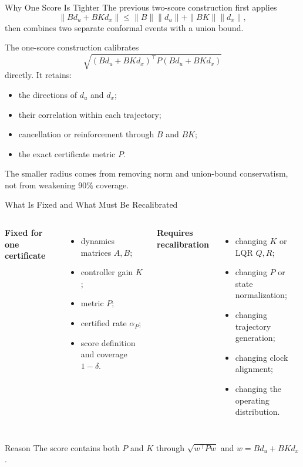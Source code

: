 \documentclass[aspectratio=43,11pt]{beamer}
\begin{document}
\begin{frame}{Why One Score Is Tighter}
The previous two-score construction first applies
\[
\|Bd_u+BKd_x\|
\leq \|B\|\|d_u\|+\|BK\|\|d_x\|,
\]
then combines two separate conformal events with a union bound.

The one-score construction calibrates
\[
\sqrt{(Bd_u+BKd_x)^\top P(Bd_u+BKd_x)}
\]
directly. It retains:
\begin{itemize}
  \item the directions of $d_u$ and $d_x$;
  \item their correlation within each trajectory;
  \item cancellation or reinforcement through $B$ and $BK$;
  \item the exact certificate metric $P$.
\end{itemize}

The smaller radius comes from removing norm and union-bound conservatism, not from weakening 90\% coverage.
\end{frame}

\begin{frame}{What Is Fixed and What Must Be Recalibrated}
\begin{columns}[T]
\textbf{Fixed for one certificate}
\begin{itemize}
  \item dynamics matrices $A,B$;
  \item controller gain $K$;
  \item metric $P$;
  \item certified rate $\alpha_P$;
  \item score definition and coverage $1-\delta$.
\end{itemize}

\textbf{Requires recalibration}
\begin{itemize}
  \item changing $K$ or LQR $Q,R$;
  \item changing $P$ or state normalization;
  \item changing trajectory generation;
  \item changing clock alignment;
  \item changing the operating distribution.
\end{itemize}
\end{columns}

\vspace{0.5em}
\begin{alertblock}{Reason}
The score contains both $P$ and $K$ through $\sqrt{w^\top Pw}$ and $w=Bd_u+BKd_x$.
\end{alertblock}
\end{frame}
\end{document}
